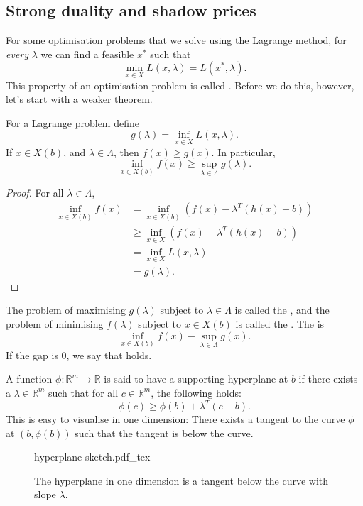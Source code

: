 \documentclass[a4paper]{scrartcl}
\newcommand{\incfig}[2]{%
    \def\svgwidth{#1mm}
    {#2.pdf_tex}
}
\begin{document}
\subsection{Strong duality and shadow prices}
For some optimisation problems that we solve using the Lagrange method, for \emph{every} $\lambda$ we can find a feasible $x^*$ such that 
\[\min_{x \in X} L (x, \lambda)=L(x^*,\lambda).\]
This property of an optimisation problem is called .
Before we do this, however, let's start with a weaker theorem.
\begin{theorem}
	 For a Lagrange problem define 
	 \[g (\lambda)=\inf_{x \in X}L (x,\lambda).\]
	 If $x \in X (b)$, and $\lambda \in \Lambda$, then $f (x)\geq g (x)$. In particular,
	 \[\inf_{x \in X(b)}f(x) \geq \sup_{\lambda \in \Lambda}g (\lambda).\]
\end{theorem}
\begin{proof}
	For all $\lambda \in \Lambda$,
	 \begin{equation*}
		  \begin{split}
			\inf_{x \in X(b)}f(x)&=\inf_{x \in X(b)}(f(x)- \lambda^T (h(x)-b))\\
			&\geq \inf_{x \in X}(f(x)- \lambda^T (h(x)-b))\\
			&=\inf_{x \in X}L (x,\lambda)\\
			&=g (\lambda).
		  \end{split}
	 \end{equation*}
	 
\end{proof}

The problem of maximising $g (\lambda)$ subject to $\lambda \in \Lambda$ is called the , and the problem of minimising $f (\lambda)$ subject to $x \in X(b)$ is called the .\newline 
The  is 
\[\inf_{x \in X(b)}f(x)- \sup_{\lambda \in \Lambda}g (x).\]
If the gap is 0, we say that  holds.
\begin{definition}[Hyperplane]
	 A function $\phi: \mathbb{R}^{m} \to \mathbb{R} $ is said to have a supporting hyperplane at $b$ if there exists a $\lambda \in \mathbb{R}^{m}$ such that for all $c \in \mathbb{R}^{m} $, the following holds: 
	 \[\phi(c)\geq \phi (b)+ \lambda^T (c-b).\]
	 This is easy to visualise in one dimension: There exists a tangent to the curve $\phi$ at $(b,\phi(b))$ such that the tangent is below the curve.
	 \begin{figure}[H]
		\centering
		\incfig{70}{hyperplane-sketch}
		\caption{The hyperplane in one dimension is a tangent below the curve with slope $\lambda$.}
	\end{figure}
\end{definition}
\end{document}
